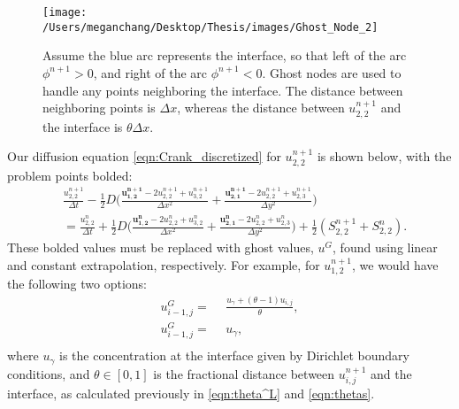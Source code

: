 \documentclass[oneside,12pt,final]{/Applications/TeX/packages/ucthesis-CA2012}
\begin{document}
\begin{mainmatter}
\begin{figure}[h!]
    \centering
    \texttt{[image: /Users/meganchang/Desktop/Thesis/images/Ghost\_Node\_2]}
    \caption[Ghost Node Implementation]{Assume the blue arc represents the interface, so that left of the arc $\phi^{n+1} > 0$, and right of the arc $\phi^{n+1} < 0$. Ghost nodes are used to handle any points neighboring the interface. The distance between neighboring points is $\Delta x$, whereas the distance between $u_{2,2}^{n+1}$ and the interface is $\theta \Delta x$.}
    \label{fig:ghost_node}
\end{figure}
Our diffusion equation \eqref{eqn:Crank_discretized} for $u_{2,2}^{n+1}$ is shown below, with the problem points bolded:
\begin{equation}
\begin{aligned}
&\frac{u_{2,2}^{n+1}}{\Delta t} - \frac{1}{2}D \bigg(\frac{\boldsymbol{u_{1,2}^{n+1}}- 2u_{2,2}^{n+1} + u_{3,2}^{n+1}}{\Delta x^2} + \frac{\boldsymbol{u_{2,1}^{n+1}} - 2u_{2,2}^{n+1} + u_{2,3}^{n+1}}{\Delta y^2}\bigg)\\
&= \frac{u_{2,2}^{n}}{\Delta t} + \frac{1}{2}D\bigg(\frac{ \boldsymbol{u_{1,2}^{n}} - 2u_{2,2}^{n} + u_{3,2}^{n}}{\Delta x^2} + \frac{\boldsymbol{u_{2,1}^{n}} - 2u_{2,2}^{n} + {u_{2,3}^{n}}}{\Delta y^2}\bigg)
+ \frac{1}{2}(S_{2,2}^{n+1} + S_{2,2}^{n}).
\end{aligned}
\end{equation}
These bolded values must be replaced with ghost values, $u^G$, found using linear and constant extrapolation, respectively. For example, for $u_{1,2}^{n+1}$, we would have the following two options:
\begin{equation}\label{eqn:ghost_nodes}
\begin{aligned}
u^G_{i-1,j} =& \>\> \frac{u_{\gamma} + (\theta - 1) u_{i,j}}{\theta},\\
u^G_{i-1,j} =& \>\> u_{\gamma},\\
\end{aligned}
\end{equation}
where $u_\gamma$ is the concentration at the interface given by Dirichlet boundary conditions, and $\theta \in [0,1]$ is the fractional distance between $u_{i,j}^{n+1}$ and the interface, as calculated previously in \eqref{eqn:theta^L} and \eqref{eqn:thetas}.


\end{mainmatter}
\end{document}
